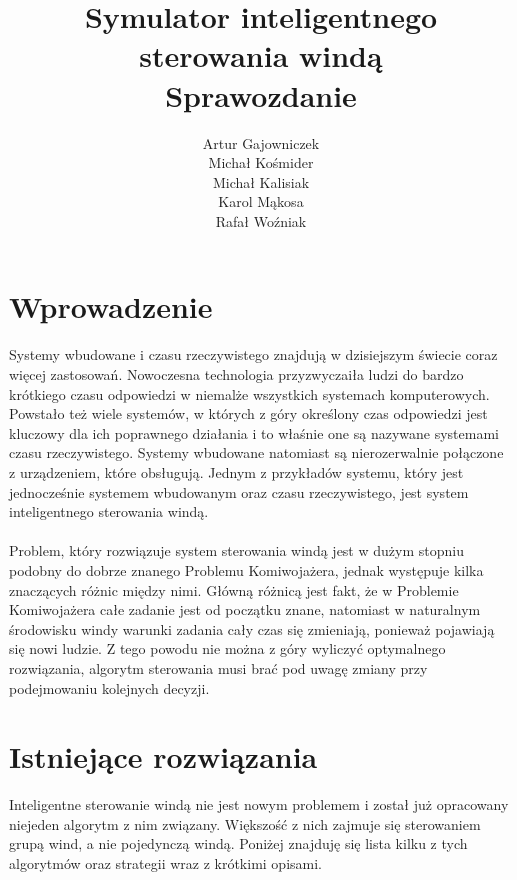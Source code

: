 \documentclass[a4paper,11pt]{article}
\title{ Symulator inteligentnego sterowania windą \\ Sprawozdanie}
\author{Artur Gajowniczek \\ Michał Kośmider \\ Michał Kalisiak \\ Karol Mąkosa \\ Rafał Woźniak}
\begin{document}
\begin{titlingpage}
\maketitle
\end{titlingpage}
\thispagestyle{empty}
\cleardoublepage

\setcounter{page}{1}

\hypertarget{toc}{}
\tableofcontents

\cleardoublepage

\section{Wprowadzenie}
Systemy wbudowane i czasu rzeczywistego znajdują w dzisiejszym świecie coraz więcej zastosowań. Nowoczesna technologia przyzwyczaiła ludzi do bardzo krótkiego czasu odpowiedzi w niemalże wszystkich systemach komputerowych. Powstało też wiele systemów, w których z góry określony czas odpowiedzi jest kluczowy dla ich poprawnego działania i to właśnie one są nazywane systemami czasu rzeczywistego. Systemy wbudowane natomiast są nierozerwalnie połączone z urządzeniem, które obsługują. Jednym z przykładów systemu, który jest jednocześnie systemem wbudowanym oraz czasu rzeczywistego, jest system inteligentnego sterowania windą.
\\
\\
Problem, który rozwiązuje system sterowania windą jest w dużym stopniu podobny do dobrze znanego Problemu Komiwojażera, jednak występuje kilka znaczących różnic między nimi. Główną różnicą jest fakt, że w Problemie Komiwojażera całe zadanie jest od początku znane, natomiast w naturalnym środowisku windy warunki zadania cały czas się zmieniają, ponieważ pojawiają się nowi ludzie. Z tego powodu nie można z góry wyliczyć optymalnego rozwiązania, algorytm sterowania musi brać pod uwagę zmiany przy podejmowaniu kolejnych decyzji.

\section{Istniejące rozwiązania}
Inteligentne sterowanie windą nie jest nowym problemem i został już opracowany niejeden algorytm z nim związany. Większość z nich zajmuje się sterowaniem grupą wind, a nie pojedynczą windą. Poniżej znajduję się lista kilku z tych algorytmów oraz strategii wraz z krótkimi opisami.
\end{document}
